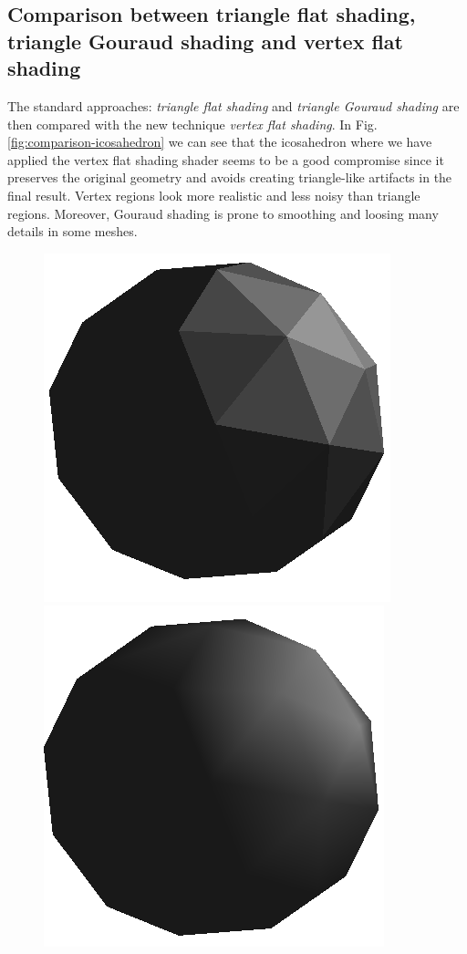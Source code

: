\subsection{Comparison between triangle flat shading, triangle Gouraud shading and vertex flat shading}
The standard approaches: \textit{triangle flat shading} and \textit{triangle Gouraud shading} are then compared with the new technique \textit{vertex flat shading}. In Fig. \ref{fig:comparison-icosahedron} we can see that the icosahedron where we have applied the vertex flat shading shader seems to be a good compromise since it preserves the original geometry and avoids creating triangle-like artifacts in the final result. Vertex regions look more realistic and less noisy than triangle regions. Moreover, Gouraud shading is prone to smoothing and loosing many details in some meshes.
\begin{figure}[!h]
    \centering
    \centering
    \includegraphics[scale=0.5]{images/flatshading.png}
    \label{fig:flat-shading-triangle}
    \endminipage\hfill
    \centering
    \includegraphics[scale=0.5]{images/gouraudshading.png}

\end{figure}

